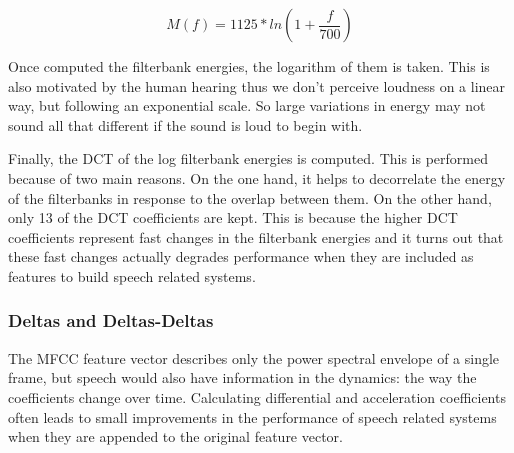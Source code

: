 \begin{equation}
M(f)=1125*ln(1 + \frac{f}{700})
\end{equation}

Once computed the filterbank energies, the logarithm of them is taken. This is also motivated by
the human hearing thus we don't perceive loudness on a linear way, but following an exponential
scale. So large variations in energy may not sound all that different if the sound is loud to 
begin with.

Finally, the DCT of the log filterbank energies is computed. This is performed because of  
two main reasons. On the one hand, it helps to decorrelate the energy of the filterbanks
in response to the overlap between them. On the other hand, only 13 of the DCT coefficients
are kept. This is because the higher DCT coefficients represent fast changes in the filterbank
energies and it turns out that these fast changes actually degrades performance 
when they are included as features to build speech related systems.


\subsubsection{Deltas and Deltas-Deltas}

The MFCC feature vector describes only the power spectral envelope of a single frame, but speech
would also have information in the dynamics: the way the coefficients change over time.	 
Calculating differential and acceleration coefficients often leads to small improvements  
in the performance of speech related systems when they are appended to the original feature vector.
